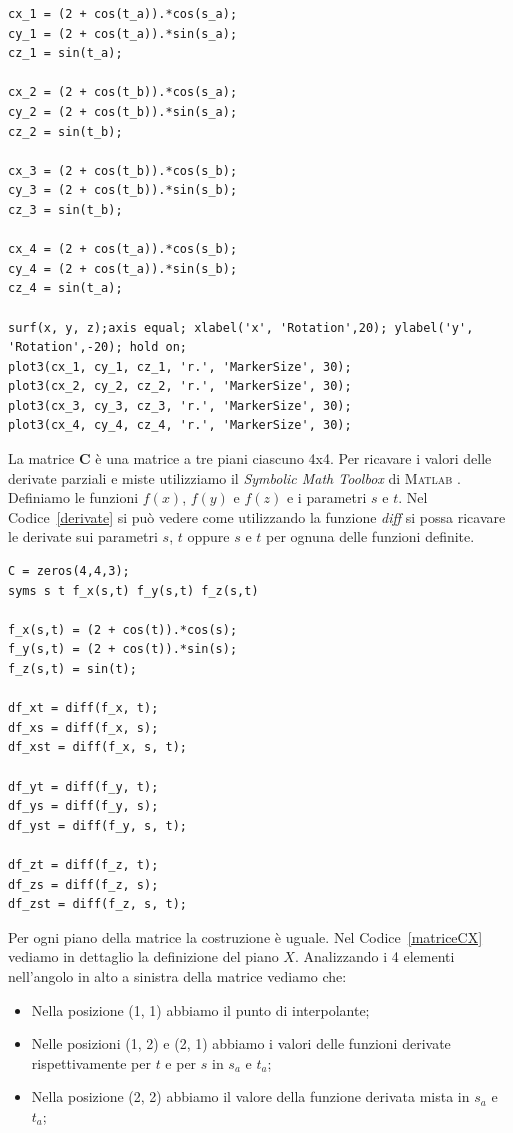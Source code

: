 \documentclass[12pt]{article}
\newcommand{\MATLAB}{\textsc{Matlab }}
\begin{document}
\begin{lstlisting}[caption={Visualizzazione dei 4 angoli della porzione di toro}, style=matlab, label={angoli}, captionpos=b]
cx_1 = (2 + cos(t_a)).*cos(s_a);
cy_1 = (2 + cos(t_a)).*sin(s_a);
cz_1 = sin(t_a);

cx_2 = (2 + cos(t_b)).*cos(s_a);
cy_2 = (2 + cos(t_b)).*sin(s_a);
cz_2 = sin(t_b);

cx_3 = (2 + cos(t_b)).*cos(s_b);
cy_3 = (2 + cos(t_b)).*sin(s_b);
cz_3 = sin(t_b);

cx_4 = (2 + cos(t_a)).*cos(s_b);
cy_4 = (2 + cos(t_a)).*sin(s_b);
cz_4 = sin(t_a);

surf(x, y, z);axis equal; xlabel('x', 'Rotation',20); ylabel('y', 'Rotation',-20); hold on;
plot3(cx_1, cy_1, cz_1, 'r.', 'MarkerSize', 30);
plot3(cx_2, cy_2, cz_2, 'r.', 'MarkerSize', 30);
plot3(cx_3, cy_3, cz_3, 'r.', 'MarkerSize', 30);
plot3(cx_4, cy_4, cz_4, 'r.', 'MarkerSize', 30);
\end{lstlisting}
La matrice $\mathbf{C}$ è una matrice a tre piani ciascuno 4x4. Per ricavare i valori delle 
derivate parziali e miste utilizziamo il \textit{Symbolic Math Toolbox} di \MATLAB.
Definiamo le funzioni $f(x)$, $f(y)$ e $f(z)$ e i parametri $s$ e $t$. Nel Codice~\ref{derivate}
si può vedere come utilizzando la funzione \textit{diff} si possa ricavare le derivate sui
parametri $s$, $t$ oppure $s$ e $t$ per ognuna delle funzioni definite.
\begin{lstlisting}[caption={Derivate delle funzioni della superficie}, style=matlab, label={derivate}, captionpos=b]
C = zeros(4,4,3);
syms s t f_x(s,t) f_y(s,t) f_z(s,t)

f_x(s,t) = (2 + cos(t)).*cos(s);
f_y(s,t) = (2 + cos(t)).*sin(s);
f_z(s,t) = sin(t);

df_xt = diff(f_x, t);
df_xs = diff(f_x, s);
df_xst = diff(f_x, s, t);

df_yt = diff(f_y, t);
df_ys = diff(f_y, s);
df_yst = diff(f_y, s, t);

df_zt = diff(f_z, t);
df_zs = diff(f_z, s);
df_zst = diff(f_z, s, t);	
\end{lstlisting}
Per ogni piano della matrice la costruzione è uguale. Nel Codice~\ref{matriceCX} vediamo in dettaglio la definizione del piano $X$. 
\newpage \noindent
Analizzando i 4 elementi nell'angolo in alto a sinistra della matrice vediamo che:
\begin{itemize}[-]
	\item Nella posizione (1, 1) abbiamo il punto di interpolante;
	\item Nelle posizioni (1, 2) e (2, 1) abbiamo i valori delle funzioni derivate rispettivamente per $t$ e per $s$ in $s_a$ e $t_a$;
	\item Nella posizione (2, 2) abbiamo il valore della funzione derivata mista in $s_a$ e $t_a$;
\end{itemize}
\end{document}
